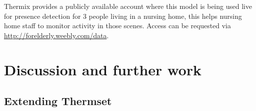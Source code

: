 \documentclass[oneside, twocolumn]{article}
\begin{document}

Thermix provides a publicly available account where this model is being used live for presence detection for 3 people living in a nursing home, this helps nursing home staff to monitor activity in those scenes. Access can be requested via \url{http://forelderly.weebly.com/data}.


\section{Discussion and further work}

\subsection{Extending Thermset}
\end{document}
